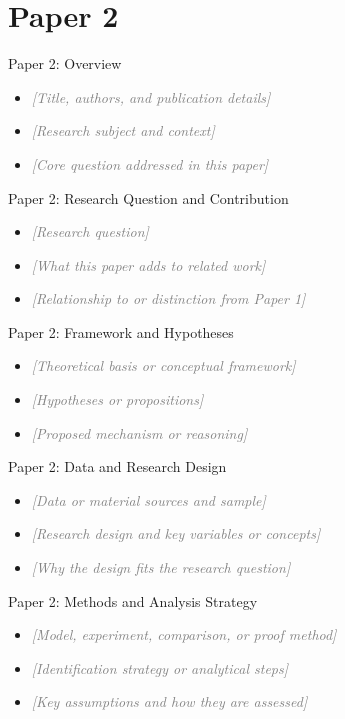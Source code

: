 \documentclass[aspectratio=169]{beamer}
\newcommand{\fillin}[1]{\textcolor{gray}{\textit{[#1]}}}
\begin{document}
\section{Paper 2}

\begin{frame}{Paper 2: Overview}
  \begin{itemize}
    \item \fillin{Title, authors, and publication details}
    \item \fillin{Research subject and context}
    \item \fillin{Core question addressed in this paper}
  \end{itemize}
\end{frame}

\begin{frame}{Paper 2: Research Question and Contribution}
  \begin{itemize}
    \item \fillin{Research question}
    \item \fillin{What this paper adds to related work}
    \item \fillin{Relationship to or distinction from Paper 1}
  \end{itemize}
\end{frame}

\begin{frame}{Paper 2: Framework and Hypotheses}
  \begin{itemize}
    \item \fillin{Theoretical basis or conceptual framework}
    \item \fillin{Hypotheses or propositions}
    \item \fillin{Proposed mechanism or reasoning}
  \end{itemize}
\end{frame}

\begin{frame}{Paper 2: Data and Research Design}
  \begin{itemize}
    \item \fillin{Data or material sources and sample}
    \item \fillin{Research design and key variables or concepts}
    \item \fillin{Why the design fits the research question}
  \end{itemize}
\end{frame}

\begin{frame}{Paper 2: Methods and Analysis Strategy}
  \begin{itemize}
    \item \fillin{Model, experiment, comparison, or proof method}
    \item \fillin{Identification strategy or analytical steps}
    \item \fillin{Key assumptions and how they are assessed}
  \end{itemize}
\end{frame}
\end{document}
